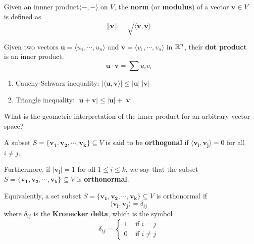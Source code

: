 \begin{definition}
    Given an innner product$\langle - , - \rangle$ on $V$, the \textbf{norm} (or \textbf{modulus}) of a vector $\bm{v} \in V$ is defined as $$||\bm{v}|| = \sqrt{\langle \bm{v}, \bm{v}\rangle}$$
    \end{definition}
    

\begin{example}
    Given two vectors $\bm{u} = \langle u_1, \cdots, u_n \rangle$ and $\bm{v}  = \langle v_1 , \cdots, v_n \rangle$ in $\mathbb{R}^n$, their \textbf{dot product} is an inner product. $$\bm{u} \cdot \bm{v} = \sum u_iv_i$$
    \end{example}

\begin{theorem}
    
    \begin{enumerate}
        \item Cauchy-Schwarz inequality: $| \langle \bm{u},\bm{v} \rangle | \leq  | \bm{u}| \ | \bm{v} |$
        \item Triangle inequality: $| \bm{u}+ \bm{v} | \leq  | \bm{u}| +| \bm{v} |$
    \end{enumerate}
    
    \end{theorem}





\begin{motivating}
What is the geometric interpretation of the inner product for an arbitrary vector space?
\end{motivating}

\begin{definition}
    A subset $S = \{\bm{v_1}, \bm{v_2}, \cdots, \bm{v_k}\} \subseteq V$ is said to be \textbf{orthogonal} if $\langle \bm{v_i}, \bm{v_j} \rangle = 0$ for all $i \neq j$.
    
    \vspace{1em}
    
    Furthermore, if $|\bm{v_i}| = 1$ for all $1 \leq i \leq k$, we say that the subset $S = \{\bm{v_1}, \bm{v_2}, \cdots, \bm{v_k}\} \subseteq V$ is \textbf{orthonormal}.
\end{definition}
    
    \begin{proposition}
        Equivalently, a set subset $S = \{\bm{v_1}, \bm{v_2}, \cdots, \bm{v_k}\} \subseteq V$ is orthonormal if $$\langle \bm{v_i}, \bm{v_j} \rangle = \delta_{ij}$$ 
        where $\delta_{ij}$ is the \textbf{Kronecker delta}, which is the symbol $$\delta_{ij} = \left\{
		\begin{array}{ll}
			1 & \text{ if } i = j \\
			0 & \text{ if } i \neq j
		\end{array}
		\right.$$
    \end{proposition}


